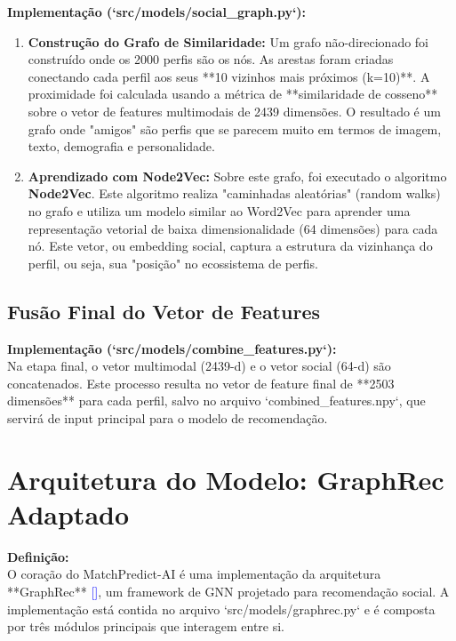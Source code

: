 \textbf{Implementação (`src/models/social_graph.py`):}
\begin{enumerate}
    \item \textbf{Construção do Grafo de Similaridade:} Um grafo não-direcionado foi construído onde os 2000 perfis são os nós. As arestas foram criadas conectando cada perfil aos seus **10 vizinhos mais próximos (k=10)**. A proximidade foi calculada usando a métrica de **similaridade de cosseno** sobre o vetor de features multimodais de 2439 dimensões. O resultado é um grafo onde "amigos" são perfis que se parecem muito em termos de imagem, texto, demografia e personalidade.
    \item \textbf{Aprendizado com Node2Vec:} Sobre este grafo, foi executado o algoritmo \textbf{Node2Vec}. Este algoritmo realiza "caminhadas aleatórias" (random walks) no grafo e utiliza um modelo similar ao Word2Vec para aprender uma representação vetorial de baixa dimensionalidade (64 dimensões) para cada nó. Este vetor, ou embedding social, captura a estrutura da vizinhança do perfil, ou seja, sua "posição" no ecossistema de perfis.
\end{enumerate}

\subsection{Fusão Final do Vetor de Features}
\textbf{Implementação (`src/models/combine_features.py`):} \\
Na etapa final, o vetor multimodal (2439-d) e o vetor social (64-d) são concatenados. Este processo resulta no vetor de feature final de **2503 dimensões** para cada perfil, salvo no arquivo `combined_features.npy`, que servirá de input principal para o modelo de recomendação.

\section{Arquitetura do Modelo: GraphRec Adaptado}
\label{sec:arquitetura_modelo}

\textbf{Definição:} \\
O coração do MatchPredict-AI é uma implementação da arquitetura **GraphRec** \textcolor{blue}{[\cite{fan2019graphrec}]}, um framework de GNN projetado para recomendação social. A implementação está contida no arquivo `src/models/graphrec.py` e é composta por três módulos principais que interagem entre si.

